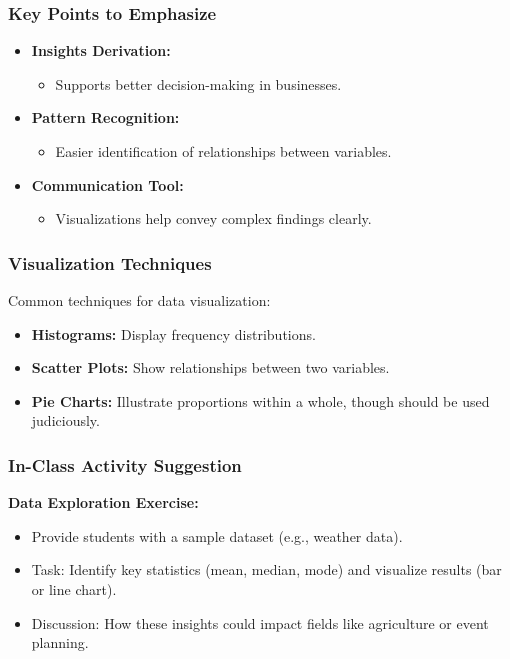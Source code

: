 \documentclass[aspectratio=169]{beamer}
\begin{document}
\begin{frame}[fragile]
    \frametitle{Key Points to Emphasize}
    
    \begin{itemize}
        \item \textbf{Insights Derivation:} 
        \begin{itemize}
            \item Supports better decision-making in businesses.
        \end{itemize}
        
        \item \textbf{Pattern Recognition:}
        \begin{itemize}
            \item Easier identification of relationships between variables.
        \end{itemize}
        
        \item \textbf{Communication Tool:}
        \begin{itemize}
            \item Visualizations help convey complex findings clearly.
        \end{itemize}
    \end{itemize}
\end{frame}

\begin{frame}[fragile]
    \frametitle{Visualization Techniques}
    
    Common techniques for data visualization:
    \begin{itemize}
        \item \textbf{Histograms:} Display frequency distributions.
        \item \textbf{Scatter Plots:} Show relationships between two variables.
        \item \textbf{Pie Charts:} Illustrate proportions within a whole, though should be used judiciously.
    \end{itemize}
\end{frame}

\begin{frame}[fragile]
    \frametitle{In-Class Activity Suggestion}
    
    \textbf{Data Exploration Exercise:}
    \begin{itemize}
        \item Provide students with a sample dataset (e.g., weather data).
        \item Task: Identify key statistics (mean, median, mode) and visualize results (bar or line chart).
        \item Discussion: How these insights could impact fields like agriculture or event planning.
    \end{itemize}
\end{frame}
\end{document}
